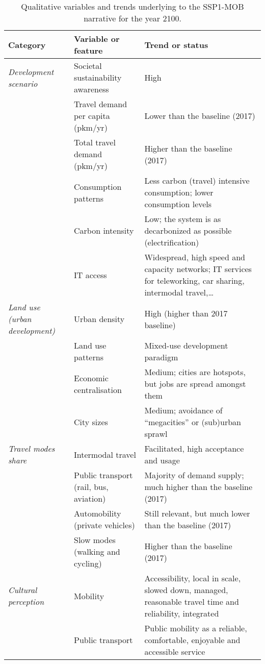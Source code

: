 \begin{table}
\centering
\caption[SSP1-MOB (2100) qualitative variables]{Qualitative variables and trends underlying to the SSP1-MOB narrative for the year 2100.}
\label{t:ssp1-mob-2100-narrative-thesis}
\scriptsize
\begin{tabular}{p{2.5cm}p{3cm}p{8cm}}
\toprule
Category & Variable or feature & Trend or status \\ \midrule
\textit{Development scenario} & Societal sustainability awareness & High \\
 & Travel demand per capita (pkm/yr) & Lower than the baseline (2017) \\
 & Total travel demand (pkm/yr) & Higher than the baseline (2017) \\
 & Consumption patterns & Less carbon (travel) intensive consumption; lower consumption levels \\
 & Carbon intensity & Low; the system is as decarbonized as possible (electrification) \\
 & IT access & Widespread, high speed and capacity networks; IT services for teleworking, car sharing, intermodal travel,\ldots\\\addlinespace
\textit{Land use (urban development)} & Urban density & High (higher than 2017 baseline) \\
 & Land use patterns & Mixed-use development paradigm \\
 & Economic centralisation & Medium; cities are hotspots, but jobs are spread amongst them \\
 & City sizes & Medium; avoidance of ``megacities'' or (sub)urban sprawl \\\addlinespace
\textit{Travel modes share} & Intermodal travel & Facilitated, high acceptance and usage \\
 & Public transport (rail, bus, aviation) & Majority of demand supply; much higher than the baseline (2017) \\
 & Automobility (private vehicles) & Still relevant, but much lower than the baseline (2017) \\
 & Slow modes (walking and cycling) & Higher than the baseline (2017) \\\addlinespace
\textit{Cultural perception} & Mobility & Accessibility, local in scale, slowed down, managed, reasonable travel time and reliability, integrated \\
 & Public transport & Public mobility as a reliable, comfortable, enjoyable and accessible service \\

\end{tabular}
\end{table}
